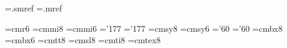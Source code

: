 \newif\ifsorted
\newread\sreffile
\newwrite{}
\newif\ifrefs \refstrue
\ifx\norefs\undefined
  \openin\sreffile=\jobname.smref
  \ifeof\sreffile \immediate\openout{}=\jobname.mref \sortedfalse
  \else \closein\sreffile \sortedtrue {}\fi
\else \refsfalse \sortedfalse
\fi
\newif\ifmini@open

\font\sixrm=cmr6 \font\eighti=cmmi8 \font\sixi=cmmi6
\skewchar\eighti='177 \skewchar\sixi='177
\font\eightsy=cmsy8 \font\sixsy=cmsy6
\skewchar\eightsy='60 \skewchar\sixsy='60
\font\eightbf=cmbx8 \font\sixbf=cmbx6
\font\eighttt=cmtt8 \hyphenchar{}
\font\eightsl=cmsl8 \font\eightit=cmti8
\font\eighttex=cmtex8 \eighttex=0pt
\def\eightpoint{\def\rm{\fam0\eightrm}%
  \textfont0=\eightrm \scriptfont0=\sixrm \scriptscriptfont0=\fiverm
  \textfont1=\eighti \scriptfont1=\sixi \scriptscriptfont1=\fivei
  \textfont2=\eightsy \scriptfont2=\sixsy \scriptscriptfont2=\fivesy
  \textfont3=\tenex \scriptfont3=\tenex \scriptscriptfont3=\tenex
  \def\it{\fam\itfam\eightit}\textfont\itfam=\eightit
  \def\sl{\fam\slfam\eightsl}\textfont\slfam=\eightsl
  \def\bf{\fam\bffam\eightbf}\textfont\bffam=\eightbf
    \scriptfont\bffam=\sixbf \scriptscriptfont\bffam=\fivebf
  \def\tt{\fam\ttfam\eighttt}\textfont\ttfam=\eighttt
  \let\sc=\sixrm
  \normalbaselineskip=9pt
  \setbox\strutbox=\hbox{\vrule height7pt depth2pt width\z@}%
  \normalbaselines\rm}

\def\minient#1#2#3{\hangindent=1em \noindent #2\miniform#3, %
  \S\ifnum#1>\z@\SN{#1}\else#1\fi.\par}
\def\miniext#1#2#3{\hangindent=1em \noindent #2\miniform#3, \mini@extref#1.\par}
\def\miniform{\futurelet\next\mini@form}
\def\mini@form{\ifx\next\zip
  \else\if=\noexpand\next \let\next\mini@equals
    \else\let\next\minicolon\fi\fi\next}
\def\zip{}
\def\mini@equals={\miniequals}
\def\miniequals{\,=\,\penalty\z@} %
\def\minicolon{: }
\def\mini@extref{\futurelet\next\mini@extrefa}
\def\mini@extrefa{\if"\next\let\next\mini@string\else\let\next\mini@cite\fi\next}
\def\mini@string"#1"{{\tentex#1}}
\def\mini@cite#1#2.{{\sc#1}\,\S#2.}
\def\uninitialized{???}
\def\twilllabel{label}

